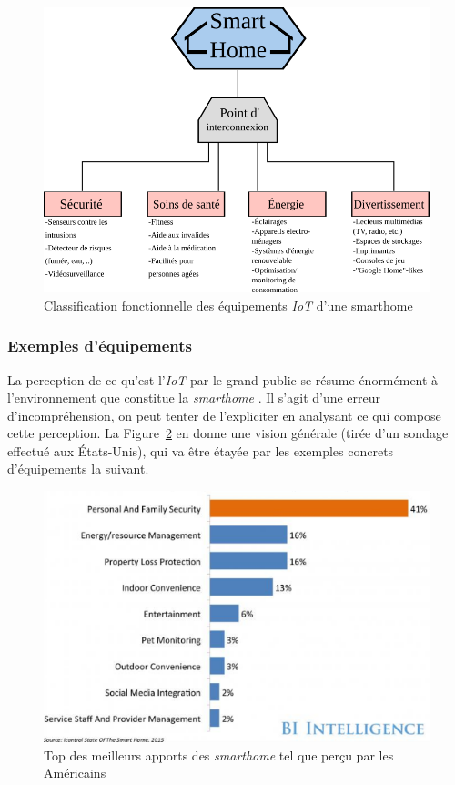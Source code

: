 \documentclass[]{article}
\begin{document}
\begin{figure}[!h]
\centering
\includegraphics[scale=1.5]{smarthome_class.png}
\caption{Classification fonctionnelle des équipements \textit{IoT} d'une smarthome}
\label{sm_class}
\end{figure}

\newpage

\subsubsection{Exemples d'équipements}

La perception de ce qu'est l'\textit{IoT} par le grand public se résume énormément à l'environnement que constitue la \textit{smarthome} \cite{Berte2018}. Il s'agit d'une erreur d'incompréhension, on peut tenter de l'expliciter en analysant ce qui compose cette perception. La Figure~\ref{benef_SH} en donne une vision générale (tirée d'un sondage effectué aux États-Unis), qui va être étayée par les exemples concrets d'équipements la suivant.

\begin{figure}[!h]
\centering
\includegraphics[scale=0.6]{benef_SH.png}
\caption{Top des meilleurs apports des \textit{smarthome} tel que perçu par les Américains}
\label{benef_SH}
\end{figure}
\end{document}
